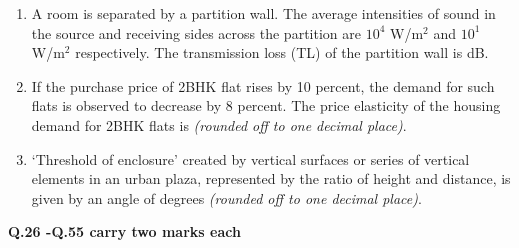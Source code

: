 \documentclass[12pt]{article}
\begin{document}
\begin{enumerate}[label=Q.\arabic*]
	\item A room is separated by a partition wall. The average intensities of sound in the source and receiving sides across the partition are $10^4$ W/m$^2$ and $10^1$ W/m$^2$ respectively. The transmission loss (TL) of the partition wall is \underline{\hspace{2cm}} dB.

	\item If the purchase price of 2BHK flat rises by 10 percent, the demand for such flats is observed to decrease by 8 percent. The price elasticity of the housing demand for 2BHK flats is \underline{\hspace{2cm}} \textit{(rounded off to one decimal place)}.

	\item ‘Threshold of enclosure’ created by vertical surfaces or series of vertical elements in an urban plaza, represented by the ratio of height and distance, is given by an angle of \underline{\hspace{2cm}} degrees \textit{(rounded off to one decimal place)}.
\end{enumerate}
\textbf{Q.26 -Q.55 carry two marks each}\hfill
\end{document}
